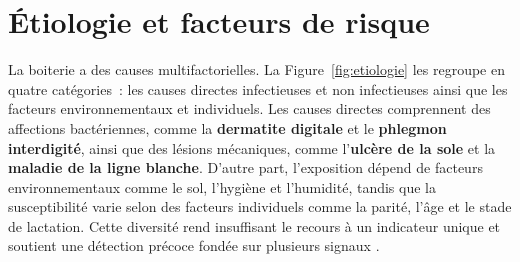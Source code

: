 \section{Étiologie et facteurs de risque}

La boiterie a des causes multifactorielles. La Figure~\ref{fig:etiologie} les regroupe en
quatre catégories~: les causes directes infectieuses et non infectieuses ainsi que les facteurs
environnementaux et individuels. Les causes directes comprennent des affections bactériennes,
comme la \textbf{dermatite digitale} et le \textbf{phlegmon interdigité}, ainsi que des lésions
mécaniques, comme l'\textbf{ulcère de la sole} et la \textbf{maladie de la ligne blanche}.
D'autre part, l'exposition dépend de facteurs environnementaux comme le sol, l'hygiène et
l'humidité, tandis que la susceptibilité varie selon des facteurs individuels comme la parité,
l'âge et le stade de lactation. Cette diversité rend insuffisant le recours à un indicateur
unique et soutient une détection précoce fondée sur plusieurs signaux
\citep{merck_hoof_origin_lameness_cattle,dairynz_preventing_managing_lameness_guide_2025}.

